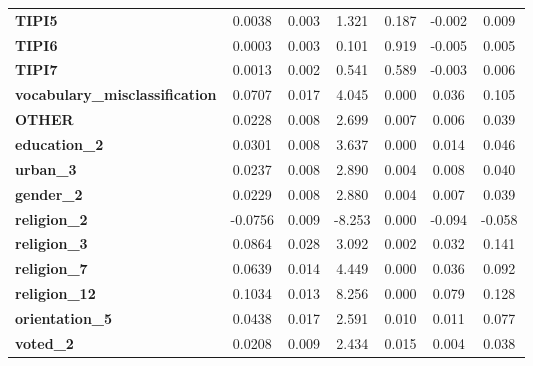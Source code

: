 \documentclass[11pt]{article}
\begin{document}
\begin{table}[ht]
\begin{tabular}{lcccccc}
\textbf{TIPI5}                         &       0.0038  &        0.003     &     1.321  &         0.187        &       -0.002    &        0.009     \\
\textbf{TIPI6}                         &       0.0003  &        0.003     &     0.101  &         0.919        &       -0.005    &        0.005     \\
\textbf{TIPI7}                         &       0.0013  &        0.002     &     0.541  &         0.589        &       -0.003    &        0.006     \\
\textbf{vocabulary\_misclassification} &       0.0707  &        0.017     &     4.045  &         0.000        &        0.036    &        0.105     \\
\textbf{OTHER}                         &       0.0228  &        0.008     &     2.699  &         0.007        &        0.006    &        0.039     \\
\textbf{education\_2}                  &       0.0301  &        0.008     &     3.637  &         0.000        &        0.014    &        0.046     \\
\textbf{urban\_3}                      &       0.0237  &        0.008     &     2.890  &         0.004        &        0.008    &        0.040     \\
\textbf{gender\_2}                     &       0.0229  &        0.008     &     2.880  &         0.004        &        0.007    &        0.039     \\
\textbf{religion\_2}                   &      -0.0756  &        0.009     &    -8.253  &         0.000        &       -0.094    &       -0.058     \\
\textbf{religion\_3}                   &       0.0864  &        0.028     &     3.092  &         0.002        &        0.032    &        0.141     \\
\textbf{religion\_7}                   &       0.0639  &        0.014     &     4.449  &         0.000        &        0.036    &        0.092     \\
\textbf{religion\_12}                  &       0.1034  &        0.013     &     8.256  &         0.000        &        0.079    &        0.128     \\
\textbf{orientation\_5}                &       0.0438  &        0.017     &     2.591  &         0.010        &        0.011    &        0.077     \\
\textbf{voted\_2}                      &       0.0208  &        0.009     &     2.434  &         0.015        &        0.004    &        0.038     \\

\end{tabular}
\end{table}
\end{document}
